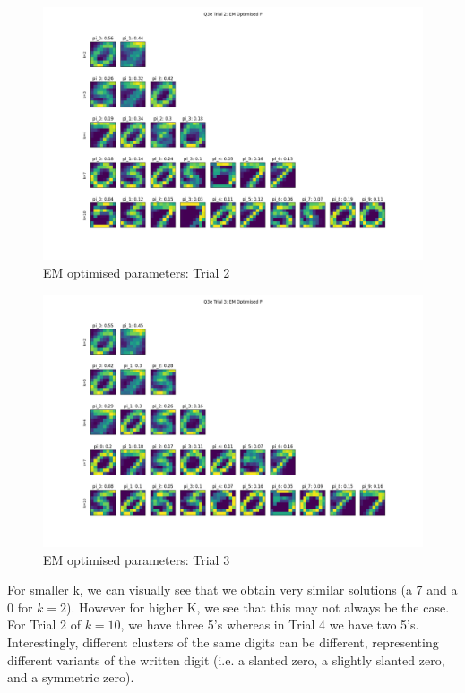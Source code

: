 \documentclass[12pt]{article}
\begin{document}
\begin{enumerate}
\begin{figure}[h]
  \centering
  \includegraphics[scale=0.3]{outputs/q3/q3e-2-optimised-p}
  \caption{EM optimised parameters: Trial 2}
  \label{fig:3e-initialised-p-trial-2}
\end{figure}
\begin{figure}[h]
  \centering
  \includegraphics[scale=0.3]{outputs/q3/q3e-3-optimised-p}
  \caption{EM optimised parameters: Trial 3}
  \label{fig:3e-initialised-p-trial-3}
\end{figure}


For smaller k, we can visually see that we obtain very similar solutions (a 7 and a 0 for $k=2$). However for higher K, we see that this may not always be the case. For Trial 2 of $k=10$, we have three 5's whereas in Trial 4 we have two 5's. Interestingly, different clusters of the same digits can be different, representing different variants of the written digit (i.e. a slanted zero, a slightly slanted zero, and a symmetric zero).


\end{enumerate}
\end{document}
